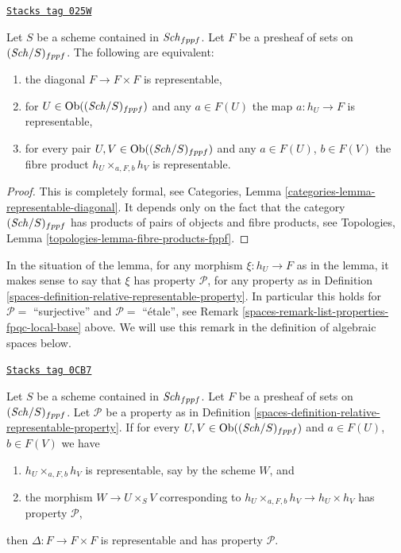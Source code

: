 \begin{lemma}
\label{spaces-lemma-representable-diagonal}
\href{https://stacks.math.columbia.edu/tag/025W}{\texttt{Stacks tag 025W}}

Let $S$ be a scheme contained in $\mathit{Sch}_{fppf}$.
Let $F$ be a presheaf of sets on $(\mathit{Sch}/S)_{fppf}$.
The following are equivalent:
\begin{enumerate}
\item the diagonal $F \to F \times F$ is representable,
\item for $U \in \operatorname{Ob}((\mathit{Sch}/S)_{fppf})$ and any $a \in F(U)$
the map $a : h_U \to F$ is representable,
\item for every pair $U, V \in \operatorname{Ob}((\mathit{Sch}/S)_{fppf})$
and any $a \in F(U)$, $b \in F(V)$ the fibre product
$h_U \times_{a, F, b} h_V$ is representable.
\end{enumerate}
\end{lemma}

\begin{proof}
This is completely formal, see
Categories, Lemma \ref{categories-lemma-representable-diagonal}.
It depends only on the fact that the category $(\mathit{Sch}/S)_{fppf}$
has products of pairs of objects and fibre products, see
Topologies, Lemma \ref{topologies-lemma-fibre-products-fppf}.
\end{proof}

In the situation of the lemma, for any morphism
$\xi : h_U \to F$ as in the lemma, it makes sense
to say that $\xi$ has property $\mathcal{P}$, for any property
as in Definition \ref{spaces-definition-relative-representable-property}.
In particular this holds for $\mathcal{P} = $ ``surjective''
and $\mathcal{P} = $ ``\'etale'', see
Remark \ref{spaces-remark-list-properties-fpqc-local-base}
above. We will use this remark in the definition
of algebraic spaces below.

\begin{lemma}
\label{spaces-lemma-transformation-diagonal-properties}
\href{https://stacks.math.columbia.edu/tag/0CB7}{\texttt{Stacks tag 0CB7}}

Let $S$ be a scheme contained in $\mathit{Sch}_{fppf}$.
Let $F$ be a presheaf of sets on $(\mathit{Sch}/S)_{fppf}$.
Let $\mathcal{P}$ be a property as in
Definition \ref{spaces-definition-relative-representable-property}.
If for every $U, V \in \operatorname{Ob}((\mathit{Sch}/S)_{fppf})$ and $a \in F(U)$,
$b \in F(V)$ we have
\begin{enumerate}
\item $h_U \times_{a, F, b} h_V$ is representable, say by the scheme $W$, and
\item the morphism $W \to U \times_S V$ corresponding to
$h_U \times_{a, F, b} h_V \to h_U \times h_V$ has property $\mathcal{P}$,
\end{enumerate}
then $\Delta : F \to F \times F$ is representable and has
property $\mathcal{P}$.
\end{lemma}

